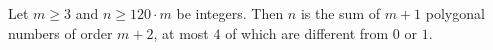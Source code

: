 \begin{theorem}
    \label{thm:thmone}
    Let $m\geq 3$ and $n\geq 120\cdot m$ be integers. Then $n$ is the sum of $m+1$ polygonal numbers of order $m+2$, at most $4$ of which are different from $0$ or $1$. 
    
\end{theorem}